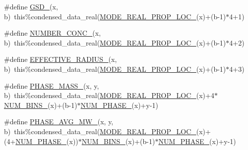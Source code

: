\begin{DoxyCompactItemize}
\item 
\#define \mbox{\hyperlink{aero__rep__modal__binned__mass_8_f90_a3bc958312d766f30f8ae6cc367611dc5}{G\+S\+D\+\_\+}}(x,  b)~this\%condensed\+\_\+data\+\_\+real(\mbox{\hyperlink{aero__rep__modal__binned__mass_8_f90_ab695417de3b45908793bd92ca251cf91}{M\+O\+D\+E\+\_\+\+R\+E\+A\+L\+\_\+\+P\+R\+O\+P\+\_\+\+L\+O\+C\+\_\+}}(x)+(b-\/1)$\ast$4+1)
\item 
\#define \mbox{\hyperlink{aero__rep__modal__binned__mass_8_f90_a97a5067d0d0de83f7d685a2147931b56}{N\+U\+M\+B\+E\+R\+\_\+\+C\+O\+N\+C\+\_\+}}(x,  b)~this\%condensed\+\_\+data\+\_\+real(\mbox{\hyperlink{aero__rep__modal__binned__mass_8_f90_ab695417de3b45908793bd92ca251cf91}{M\+O\+D\+E\+\_\+\+R\+E\+A\+L\+\_\+\+P\+R\+O\+P\+\_\+\+L\+O\+C\+\_\+}}(x)+(b-\/1)$\ast$4+2)
\item 
\#define \mbox{\hyperlink{aero__rep__modal__binned__mass_8_f90_af90cc695d8ca7bff1de52f2648a1ea1f}{E\+F\+F\+E\+C\+T\+I\+V\+E\+\_\+\+R\+A\+D\+I\+U\+S\+\_\+}}(x,  b)~this\%condensed\+\_\+data\+\_\+real(\mbox{\hyperlink{aero__rep__modal__binned__mass_8_f90_ab695417de3b45908793bd92ca251cf91}{M\+O\+D\+E\+\_\+\+R\+E\+A\+L\+\_\+\+P\+R\+O\+P\+\_\+\+L\+O\+C\+\_\+}}(x)+(b-\/1)$\ast$4+3)
\item 
\#define \mbox{\hyperlink{aero__rep__modal__binned__mass_8_f90_aed11d52678d2b6369215eea0a0533a84}{P\+H\+A\+S\+E\+\_\+\+M\+A\+S\+S\+\_\+}}(x,  y,  b)~this\%condensed\+\_\+data\+\_\+real(\mbox{\hyperlink{aero__rep__modal__binned__mass_8_f90_ab695417de3b45908793bd92ca251cf91}{M\+O\+D\+E\+\_\+\+R\+E\+A\+L\+\_\+\+P\+R\+O\+P\+\_\+\+L\+O\+C\+\_\+}}(x)+4$\ast$\mbox{\hyperlink{aero__rep__modal__binned__mass_8_f90_ae54530817d65033793af17ccdea393fc}{N\+U\+M\+\_\+\+B\+I\+N\+S\+\_\+}}(x)+(b-\/1)$\ast$\mbox{\hyperlink{aero__rep__single__particle_8_f90_aff1191174604af4c86c622f98cd18c17}{N\+U\+M\+\_\+\+P\+H\+A\+S\+E\+\_\+}}(x)+y-\/1)
\item 
\#define \mbox{\hyperlink{aero__rep__modal__binned__mass_8_f90_adcbbdc8b57268939e9ac1317011526be}{P\+H\+A\+S\+E\+\_\+\+A\+V\+G\+\_\+\+M\+W\+\_\+}}(x,  y,  b)~this\%condensed\+\_\+data\+\_\+real(\mbox{\hyperlink{aero__rep__modal__binned__mass_8_f90_ab695417de3b45908793bd92ca251cf91}{M\+O\+D\+E\+\_\+\+R\+E\+A\+L\+\_\+\+P\+R\+O\+P\+\_\+\+L\+O\+C\+\_\+}}(x)+(4+\mbox{\hyperlink{aero__rep__single__particle_8_f90_aff1191174604af4c86c622f98cd18c17}{N\+U\+M\+\_\+\+P\+H\+A\+S\+E\+\_\+}}(x))$\ast$\mbox{\hyperlink{aero__rep__modal__binned__mass_8_f90_ae54530817d65033793af17ccdea393fc}{N\+U\+M\+\_\+\+B\+I\+N\+S\+\_\+}}(x)+(b-\/1)$\ast$\mbox{\hyperlink{aero__rep__single__particle_8_f90_aff1191174604af4c86c622f98cd18c17}{N\+U\+M\+\_\+\+P\+H\+A\+S\+E\+\_\+}}(x)+y-\/1)
\end{DoxyCompactItemize}

